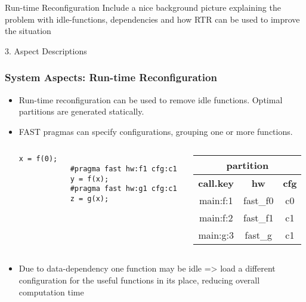 \begin{frame}{Run-time Reconfiguration}
  Include a nice background picture explaining the problem with
  idle-functions, dependencies and how RTR can be used to improve the
  situation
\end{frame}
\begin{frame}[fragile]{3. Aspect Descriptions}
  \frametitle{System Aspects: Run-time Reconfiguration}
  \begin{itemize}
  \item Run-time reconfiguration can be used to remove idle
    functions. Optimal partitions are generated statically.
  \item FAST pragmas can specify configurations, grouping one
    or more functions.
    \begin{columns}
      \begin{column}{.55\textwidth}
        \begin{center}
          \begin{lstlisting}[style=MaxC]
            x = f(0);
            #pragma fast hw:f1 cfg:c1
            y = f(x);
            #pragma fast hw:g1 cfg:c1
            z = g(x);
          \end{lstlisting}
        \end{center}
      \end{column}
      \begin{column}{.45\textwidth}
        {\footnotesize
          \begin{table}[!h]
            \renewcommand{\arraystretch}{1.1}
            \hspace{-1cm}
            \begin{tabular}{c|c|c}
              \multicolumn{3}{c}{\bf{partition}} \\
              \hline
              \bf{call.key} & \bf{hw} & \bf{cfg}  \\
              \hline
              main:f:1 & fast\_f0 & c0 \\
              main:f:2 & fast\_f1 & c1 \\
              main:g:3 & fast\_g & c1 \\
            \end{tabular}
          \end{table}
        }
      \end{column}
    \end{columns}
  \item Due to data-dependency one function may be idle => load a
    different configuration for the useful functions in its place,
    reducing overall computation time
  \end{itemize}
\end{frame}

